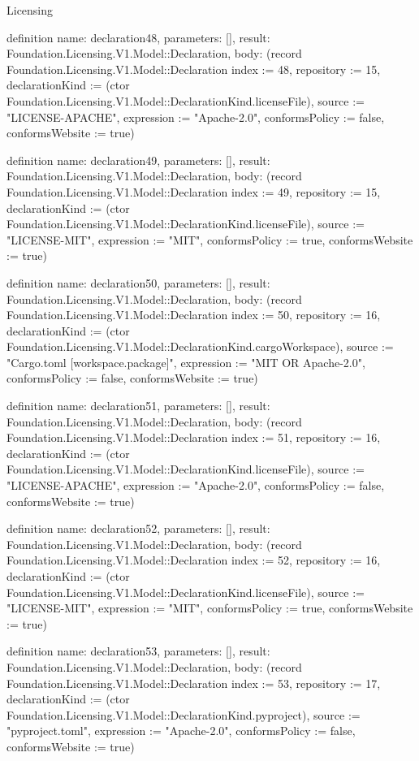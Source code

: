 \begin{lexlean}{Licensing}
\begin{semanticmodule}
definition{
  name: declaration48,
  parameters: [],
  result: Foundation.Licensing.V1.Model::Declaration,
  body: (record Foundation.Licensing.V1.Model::Declaration {index := 48, repository := 15, declarationKind := (ctor Foundation.Licensing.V1.Model::DeclarationKind.licenseFile), source := "LICENSE-APACHE", expression := "Apache-2.0", conformsPolicy := false, conformsWebsite := true})
}

definition{
  name: declaration49,
  parameters: [],
  result: Foundation.Licensing.V1.Model::Declaration,
  body: (record Foundation.Licensing.V1.Model::Declaration {index := 49, repository := 15, declarationKind := (ctor Foundation.Licensing.V1.Model::DeclarationKind.licenseFile), source := "LICENSE-MIT", expression := "MIT", conformsPolicy := true, conformsWebsite := true})
}

definition{
  name: declaration50,
  parameters: [],
  result: Foundation.Licensing.V1.Model::Declaration,
  body: (record Foundation.Licensing.V1.Model::Declaration {index := 50, repository := 16, declarationKind := (ctor Foundation.Licensing.V1.Model::DeclarationKind.cargoWorkspace), source := "Cargo.toml [workspace.package]", expression := "MIT OR Apache-2.0", conformsPolicy := false, conformsWebsite := true})
}

definition{
  name: declaration51,
  parameters: [],
  result: Foundation.Licensing.V1.Model::Declaration,
  body: (record Foundation.Licensing.V1.Model::Declaration {index := 51, repository := 16, declarationKind := (ctor Foundation.Licensing.V1.Model::DeclarationKind.licenseFile), source := "LICENSE-APACHE", expression := "Apache-2.0", conformsPolicy := false, conformsWebsite := true})
}

definition{
  name: declaration52,
  parameters: [],
  result: Foundation.Licensing.V1.Model::Declaration,
  body: (record Foundation.Licensing.V1.Model::Declaration {index := 52, repository := 16, declarationKind := (ctor Foundation.Licensing.V1.Model::DeclarationKind.licenseFile), source := "LICENSE-MIT", expression := "MIT", conformsPolicy := true, conformsWebsite := true})
}

definition{
  name: declaration53,
  parameters: [],
  result: Foundation.Licensing.V1.Model::Declaration,
  body: (record Foundation.Licensing.V1.Model::Declaration {index := 53, repository := 17, declarationKind := (ctor Foundation.Licensing.V1.Model::DeclarationKind.pyproject), source := "pyproject.toml", expression := "Apache-2.0", conformsPolicy := false, conformsWebsite := true})
}


\end{semanticmodule}
\end{lexlean}
